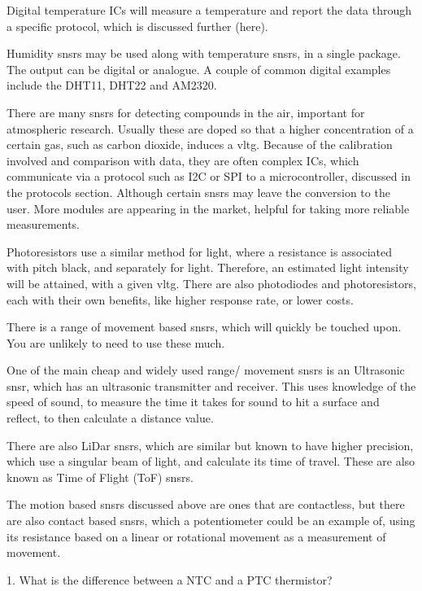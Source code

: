 \documentclass[a4paper,11pt]{report}
\newcommand{\Quiz}[1] %
{
\par\noindent %
\phantomsection %
\todo[inline, color=blue!30]{\textbf{#1}} %
\vspace{1em} %
}
\begin{document}
Digital temperature ICs will measure a temperature and report the data through a specific protocol, which is discussed further (here).


Humidity \gls{snsr}s may be used along with temperature \gls{snsr}s, in a single package. The output can be digital or analogue. A couple of common digital examples include the DHT11, DHT22 and AM2320.


There are many \gls{snsr}s for detecting compounds in the air, important for atmospheric research. Usually these are doped so that a higher concentration of a certain gas, such as carbon dioxide, induces a \gls{vltg}. Because of the calibration involved and comparison with data, they are often complex ICs, which communicate via a protocol such as I2C or SPI to a microcontroller, discussed in the protocols section. Although certain \gls{snsr}s may leave the conversion to the user. More modules are appearing in the market, helpful for taking more reliable measurements.


Photoresistors use a similar method for light, where a resistance is associated with pitch black, and separately for light. Therefore, an estimated light intensity will be attained, with a given \gls{vltg}. There are also photodiodes and photoresistors, each with their own benefits, like higher response rate, or lower costs.


There is a range of movement based \gls{snsr}s, which will quickly be touched upon. You are unlikely to need to use these much.

One of the main cheap and widely used range/ movement \gls{snsr}s is an Ultrasonic \gls{snsr}, which has an ultrasonic transmitter and receiver. This uses knowledge of the speed of sound, to measure the time it takes for sound to hit a surface and reflect, to then calculate a distance value.

There are also LiDar \gls{snsr}s, which are similar but known to have higher precision, which use a singular beam of light, and calculate its time of travel. These are also known as Time of Flight (ToF) \gls{snsr}s.

The motion based \gls{snsr}s discussed above are ones that are contactless, but there are also contact based \gls{snsr}s, which a potentiometer could be an example of, using its resistance based on a linear or rotational movement as a measurement of movement.

\Quiz{Quiz}

1. What is the difference between a NTC and a PTC thermistor?
\end{document}
